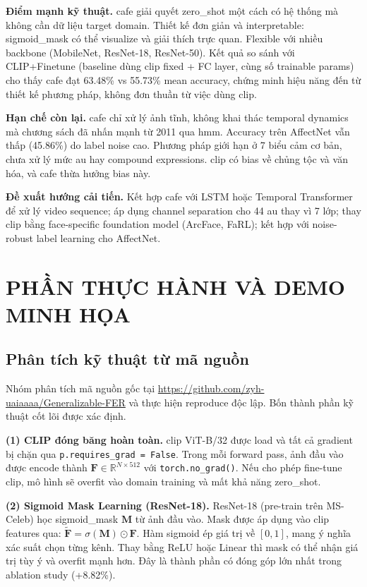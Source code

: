 \documentclass[12pt,a4paper]{article}
\let\oldtextbf\textbf
\renewcommand{\textbf}[1]{\oldtextbf{\textcolor{hcmublue}{#1}}}
\begin{document}
\textbf{Điểm mạnh kỹ thuật.} \gls{cafe} giải quyết \gls{zero_shot} một cách có hệ thống mà không cần dữ liệu target domain. Thiết kế đơn giản và interpretable: \gls{sigmoid_mask} có thể visualize và giải thích trực quan. Flexible với nhiều backbone (MobileNet, ResNet-18, ResNet-50). Kết quả so sánh với CLIP+Finetune (baseline dùng \gls{clip} fixed + FC layer, cùng số trainable params) cho thấy \gls{cafe} đạt 63.48\% vs 55.73\% mean accuracy, chứng minh hiệu năng đến từ thiết kế phương pháp, không đơn thuần từ việc dùng \gls{clip}.

\textbf{Hạn chế còn lại.} \gls{cafe} chỉ xử lý ảnh tĩnh, không khai thác temporal dynamics mà chương sách đã nhấn mạnh từ 2011 qua \gls{hmm}. Accuracy trên AffectNet vẫn thấp (45.86\%) do label noise cao. Phương pháp giới hạn ở 7 biểu cảm cơ bản, chưa xử lý mức \gls{au} hay compound expressions. \gls{clip} có bias về chủng tộc và văn hóa, và \gls{cafe} thừa hưởng bias này.

\textbf{Đề xuất hướng cải tiến.} Kết hợp \gls{cafe} với LSTM hoặc Temporal Transformer để xử lý video sequence; áp dụng channel separation cho 44 \gls{au} thay vì 7 lớp; thay \gls{clip} bằng face-specific foundation model (ArcFace, FaRL); kết hợp với noise-robust label learning cho AffectNet.


\section{PHẦN THỰC HÀNH VÀ DEMO MINH HỌA}

\subsection{Phân tích kỹ thuật từ mã nguồn}

Nhóm phân tích mã nguồn gốc tại \url{https://github.com/zyh-uaiaaaa/Generalizable-FER} và thực hiện reproduce độc lập. Bốn thành phần kỹ thuật cốt lõi được xác định.

\textbf{(1) CLIP đóng băng hoàn toàn.}
\gls{clip} ViT-B/32 được load và tất cả gradient bị chặn qua \texttt{p.requires\_grad = False}. Trong mỗi forward pass, ảnh đầu vào được encode thành $\mathbf{F} \in \mathbb{R}^{N \times 512}$ với \texttt{torch.no\_grad()}. Nếu cho phép fine-tune \gls{clip}, mô hình sẽ overfit vào domain training và mất khả năng \gls{zero_shot}.

\textbf{(2) Sigmoid Mask Learning (ResNet-18).}
ResNet-18 (pre-train trên MS-Celeb) học \gls{sigmoid_mask} $\mathbf{M}$ từ ảnh đầu vào. Mask được áp dụng vào \gls{clip} features qua: $\tilde{\mathbf{F}} = \sigma(\mathbf{M}) \odot \mathbf{F}$. Hàm sigmoid ép giá trị về $[0,1]$, mang ý nghĩa xác suất chọn từng kênh. Thay bằng ReLU hoặc Linear thì mask có thể nhận giá trị tùy ý và overfit mạnh hơn. Đây là thành phần có đóng góp lớn nhất trong ablation study (+8.82\%).
\end{document}
